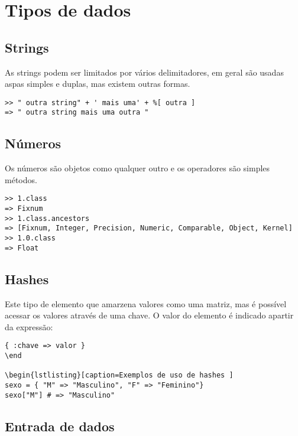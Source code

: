 \documentclass[espaco=simples,appendix=Name]{abnt}
\begin{document}
\section { Tipos de dados }

\subsection { Strings }

As strings podem ser limitados por vários delimitadores, em geral são usadas aspas simples e duplas, mas existem outras formas.

\begin{lstlisting}[caption=Exemplos de uso de string]
>> " outra string" + ' mais uma' + %[ outra ]
=> " outra string mais uma outra "
\end{lstlisting}

\subsection { Números }

Os números são objetos como qualquer outro e os operadores são simples métodos.

\begin{lstlisting}[caption=Exemplos de uso de números ]
>> 1.class
=> Fixnum
>> 1.class.ancestors
=> [Fixnum, Integer, Precision, Numeric, Comparable, Object, Kernel]
>> 1.0.class
=> Float
\end{lstlisting}

\subsection { Hashes }

Este tipo de elemento que amarzena valores como uma matriz, mas é possível acessar os valores através de uma chave. O valor do elemento é indicado apartir da expressão:

\begin{lstlisting}[caption=Syntaxe do hash ]
{ :chave => valor }
\end

\begin{lstlisting}[caption=Exemplos de uso de hashes ]
sexo = { "M" => "Masculino", "F" => "Feminino"}
sexo["M"] # => "Masculino"
\end{lstlisting}

\subsection { Entrada de dados }
\end{document}

